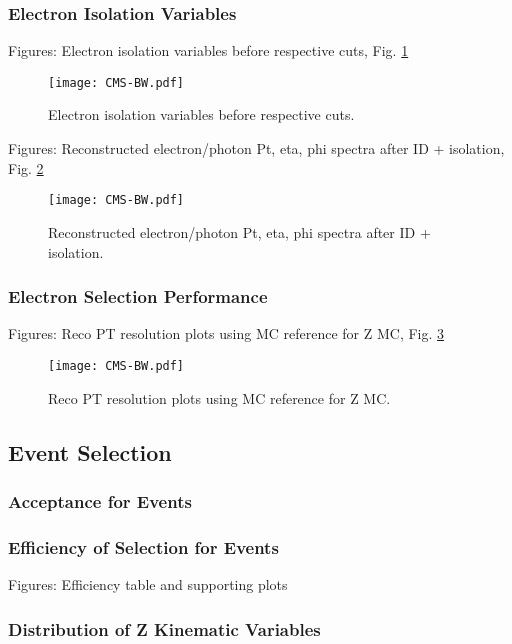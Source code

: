 \subsubsection{Electron Isolation Variables}
Figures: Electron isolation variables before respective cuts, Fig. \ref{fig:ElecIsoVars}

 \begin{figure}[htb]
  \begin{center}
    \texttt{[image: CMS-BW.pdf]}
  \end{center}
  \caption[Electron isolation variables before respective cuts]{Electron isolation variables before respective cuts.}
  \label{fig:ElecIsoVars}
 \end{figure}



Figures: Reconstructed electron/photon Pt, eta, phi spectra after ID + isolation, Fig. \ref{fig:RecoSpectraAfterEidEiso}

 \begin{figure}[htb]
  \begin{center}
    \texttt{[image: CMS-BW.pdf]}
  \end{center}
  \caption[Reconstructed electron/photon Pt, eta, phi spectra after ID + isolation]{Reconstructed electron/photon Pt, eta, phi spectra after ID + isolation.}
  \label{fig:RecoSpectraAfterEidEiso}
 \end{figure}


\subsubsection{Electron Selection Performance} %
Figures: Reco PT resolution plots using MC reference for Z MC, Fig. \ref{fig:RecoPtResolution}

 \begin{figure}[htb]
  \begin{center}
    \texttt{[image: CMS-BW.pdf]}
  \end{center}
  \caption[Reco PT resolution plots using MC reference for Z MC]{Reco PT resolution plots using MC reference for Z MC.}
  \label{fig:RecoPtResolution}
 \end{figure}


\subsection{\Zee Event Selection}
\subsubsection{Acceptance for \Zee Events}
\subsubsection{Efficiency of Selection for \Zee Events}
Figures: Efficiency table and supporting plots

\subsubsection{Distribution of Z Kinematic Variables}
